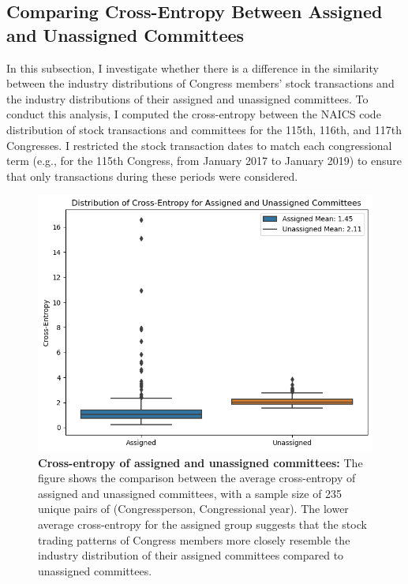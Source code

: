 \documentclass[15pt,letterpaper]{article}
\begin{document}
\subsection{Comparing Cross-Entropy Between Assigned and Unassigned Committees}

In this subsection, I investigate whether there is a difference in the similarity between the industry distributions of Congress members' stock transactions and the industry distributions of their assigned and unassigned committees. 
To conduct this analysis, I computed the cross-entropy between the NAICS code distribution of stock transactions and committees for the 115th, 116th, and 117th Congresses. I restricted the stock transaction dates to match each congressional term (e.g., for the 115th Congress, from January 2017 to January 2019) to ensure that only transactions during these periods were considered.

\begin{figure}[h!]
  \centering
  \includegraphics[width=1\textwidth]{imgs/output-new.png}
  \caption{\textbf{Cross-entropy of assigned and unassigned committees:} The figure shows the comparison between the average cross-entropy of assigned and unassigned committees, with a sample size of 235 unique pairs of (Congressperson, Congressional year). The lower average cross-entropy for the assigned group suggests that the stock trading patterns of Congress members more closely resemble the industry distribution of their assigned committees compared to unassigned committees.}
  \label{fig:paired_ttest}
\end{figure}  
\end{document}
